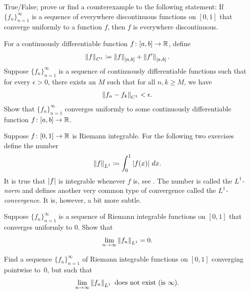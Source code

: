 \begin{exercise}
True/False; prove or find a counterexample to the following statement:
If $\{ f_n \}_{n=1}^\infty$ is a sequence of everywhere discontinuous functions on $[0,1]$
that converge uniformly to a function $f$, then $f$ is everywhere
discontinuous.
\end{exercise}

\begin{exercise} \label{c1uniflim:exercise}
For a continuously differentiable function $f \colon [a,b] \to {\mathbb{R}}$, define
\begin{equation*}
\left\lVert {f} \right\rVert_{C^1} \coloneqq \left\lVert {f} \right\rVert_{[a,b]} + \left\lVert {f'} \right\rVert_{[a,b]} .
\end{equation*}
Suppose $\{ f_n \}_{n=1}^\infty$ is a sequence of continuously differentiable
functions such that for every $\epsilon >0$, there exists an $M$
such that for all $n,k \geq M$, we have
\begin{equation*}
\left\lVert {f_n-f_k} \right\rVert_{C^1} < \epsilon .
\end{equation*}
Show that $\{ f_n \}_{n=1}^\infty$ converges uniformly to some continuously differentiable
function $f \colon [a,b] \to {\mathbb{R}}$.
\end{exercise}

\begin{exnote}
Suppose 
$f \colon [0,1] \to {\mathbb{R}}$ is Riemann integrable.
For the following two exercises define 
the number
\begin{equation*}
\left\lVert {f} \right\rVert_{L^1} \coloneqq 
\int_0^1 \left\lvert {f(x)} \right\rvert\,dx .
\end{equation*}
It is true that $\left\lvert {f} \right\rvert$ is integrable whenever $f$ is, see
.
The number is called the \emph{$L^1$-norm} and
defines another very common type of
convergence called the
\emph{$L^1$-convergence}.
It is, however, a bit more subtle.
\end{exnote}

\begin{exercise}
Suppose $\{ f_n \}_{n=1}^\infty$ is a sequence of Riemann integrable functions on $[0,1]$
that converges uniformly
to $0$.  Show that
\begin{equation*}
\lim_{n\to\infty} \left\lVert {f_n} \right\rVert_{L^1} = 0 .
\end{equation*}
\end{exercise}

\begin{exercise}
Find a sequence $\{ f_n \}_{n=1}^\infty$ of Riemann integrable functions 
on $[0,1]$ converging pointwise to~$0$, but such that
\begin{equation*}
\lim_{n\to\infty} \left\lVert {f_n} \right\rVert_{L^1} \text{ does not exist (is } \infty\text{)}.
\end{equation*}
\end{exercise}

